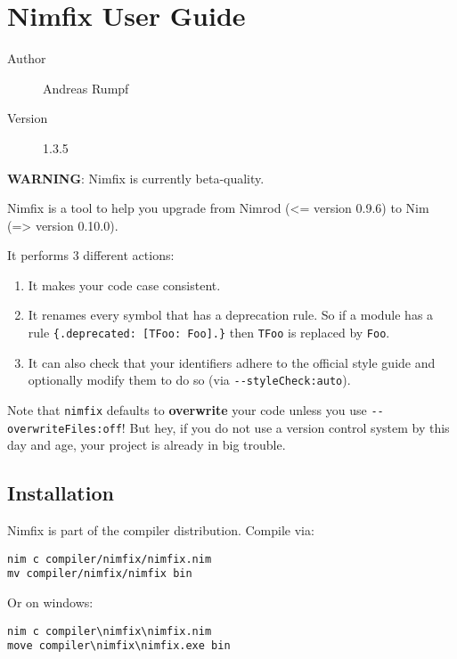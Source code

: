 \hypertarget{nimfix-user-guide}{%
\section{Nimfix User Guide}\label{nimfix-user-guide}}

\begin{description}
\item[Author]
Andreas Rumpf
\item[Version]
1.3.5
\end{description}

\textbf{WARNING}: Nimfix is currently beta-quality.

Nimfix is a tool to help you upgrade from Nimrod (\textless= version
0.9.6) to Nim (=\textgreater{} version 0.10.0).

It performs 3 different actions:

\begin{enumerate}
\def\labelenumi{\arabic{enumi}.}
\tightlist
\item
  It makes your code case consistent.
\item
  It renames every symbol that has a deprecation rule. So if a module
  has a rule \texttt{\{.deprecated:\ {[}TFoo:\ Foo{]}.\}} then
  \texttt{TFoo} is replaced by \texttt{Foo}.
\item
  It can also check that your identifiers adhere to the official style
  guide and optionally modify them to do so (via
  \texttt{-\/-styleCheck:auto}).
\end{enumerate}

Note that \texttt{nimfix} defaults to \textbf{overwrite} your code
unless you use \texttt{-\/-overwriteFiles:off}! But hey, if you do not
use a version control system by this day and age, your project is
already in big trouble.

\hypertarget{installation}{%
\subsection{Installation}\label{installation}}

Nimfix is part of the compiler distribution. Compile via:

\begin{verbatim}
nim c compiler/nimfix/nimfix.nim
mv compiler/nimfix/nimfix bin
\end{verbatim}

Or on windows:

\begin{verbatim}
nim c compiler\nimfix\nimfix.nim
move compiler\nimfix\nimfix.exe bin
\end{verbatim}

